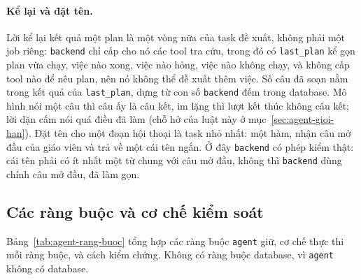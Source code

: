 \paragraph{Kể lại và đặt tên.} Lời kể lại kết quả một plan là một vòng nữa của task đề xuất, không
phải một job riêng: \texttt{backend} chỉ cấp cho nó các tool tra cứu, trong đó có \texttt{last\_plan}
kể gọn plan vừa chạy, việc nào xong, việc nào hỏng, việc nào không chạy, và không cấp tool nào để
nêu plan, nên nó không thể đề xuất thêm việc. Số câu đã soạn nằm trong kết quả của
\texttt{last\_plan}, dựng từ con số \texttt{backend} đếm trong database. Mô hình nói một câu thì câu
ấy là câu kết, im lặng thì lượt kết thúc không câu kết; lời dặn cấm nói quá điều đã làm (chỗ hở của luật này ở
mục~\ref{sec:agent-gioi-han}). Đặt tên cho một đoạn hội thoại là task nhỏ nhất: một hàm, nhận câu mở
đầu của giáo viên và trả về một cái tên ngắn. Ở đây \texttt{backend} có phép kiểm thật: cái tên phải
có ít nhất một từ chung với câu mở đầu, không thì \texttt{backend} dùng chính câu mở đầu, đã làm
gọn.

\subsection{Các ràng buộc và cơ chế kiểm soát}

Bảng~\ref{tab:agent-rang-buoc} tổng hợp các ràng buộc \texttt{agent} giữ, cơ chế thực thi mỗi ràng
buộc, và cách kiểm chứng. Không có ràng buộc database, vì \texttt{agent} không có database.

